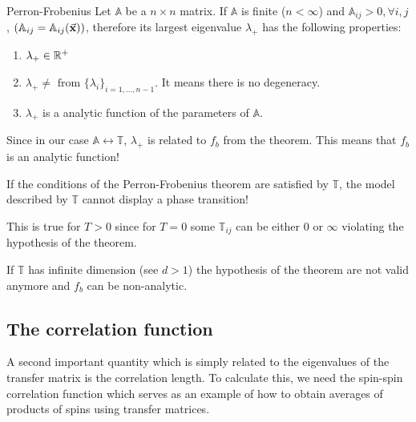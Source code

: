\documentclass[../../Main/Main.tex]{subfiles}
\begin{document}
  \begin{theorem}{Perron-Frobenius}{}
  Let \( \mathbb{A} \) be a \( n \times n \) matrix. If \( \mathbb{A} \) is finite (\( n < \infty  \)) and \( \mathbb{A}_{ij} > 0 , \forall i,j \), \( (\mathbb{A}_{ij}=\mathbb{A}_{ij} (\va{x})) \), therefore its largest eigenvalue \( \lambda _+ \) has the following properties:
  \begin{enumerate}
  \item \( \lambda _+ \in \mathbb{R}^+  \)
  \item \( \lambda _+ \neq \text{ from } \{ \lambda _i \}_{i=1,\dots, n-1 }   \). It means there is no degeneracy.
  \item \( \lambda _+ \) is a analytic function of the parameters of \( \mathbb{A} \).
  \end{enumerate}
  \end{theorem}

\begin{remark}
Since in our case \( \mathbb{A} \leftrightarrow  \mathbb{T} \), \( \lambda _+ \) is related to \( f_b \) from the theorem. This means that \( f_b \) is an analytic function!
\end{remark}
If the conditions of the Perron-Frobenius theorem are satisfied by \( \mathbb{T} \), the model described by  \( \mathbb{T} \) cannot display a phase transition!
\begin{remark}
This is true for \( T>0 \) since for \( T=0 \) some \( \mathbb{T}_{ij} \) can be either 0 or \( \infty  \) violating the hypothesis of the theorem.
\end{remark}
\begin{remark}
If \( \mathbb{T} \) has infinite dimension (see \( d>1 \)) the hypothesis of the theorem are not valid anymore and \( f_b \) can be non-analytic.
\end{remark}


\subsection{The correlation function}
A second important quantity which is simply related to the eigenvalues of the transfer matrix is the correlation length. To calculate this, we need the spin-spin correlation function which serves as an example of how to obtain averages of products of spins using transfer matrices.
\end{document}
